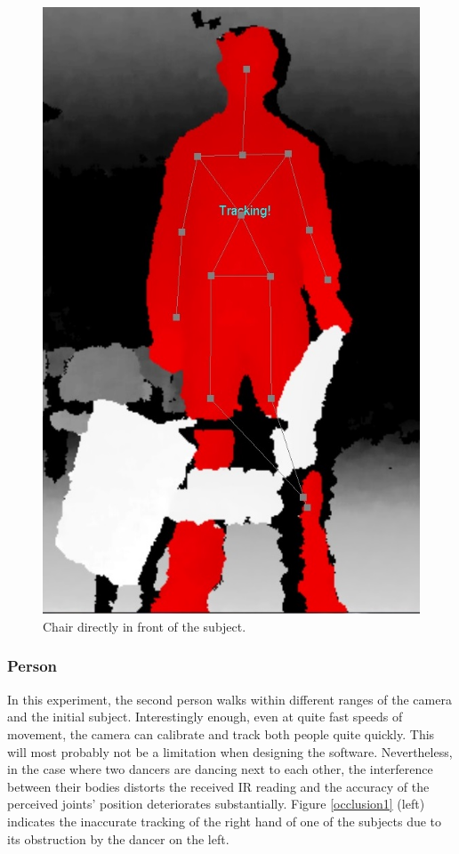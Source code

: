 \documentclass[11pt,a4paper]{article}
\begin{document}
\begin{figure}[H]
\center
\includegraphics[scale=0.2]{Chair.jpg} 
\caption{Chair directly in front of the subject.}
\label{chair}
\end{figure} 
\subsubsection{Person}
\noindent
In this experiment, the second person walks within different ranges of the camera and the initial subject. Interestingly enough, even at quite fast speeds of movement, the camera can calibrate and track both people quite quickly. This will most probably not be a limitation when designing the software. Nevertheless, in the case where two dancers are dancing next to each other, the interference between their bodies distorts the received IR reading and the accuracy of the perceived joints' position deteriorates substantially. Figure \ref{occlusion1} (left) indicates the inaccurate tracking of the right hand of one of the subjects due to its obstruction by the dancer on the left.
\end{document}
